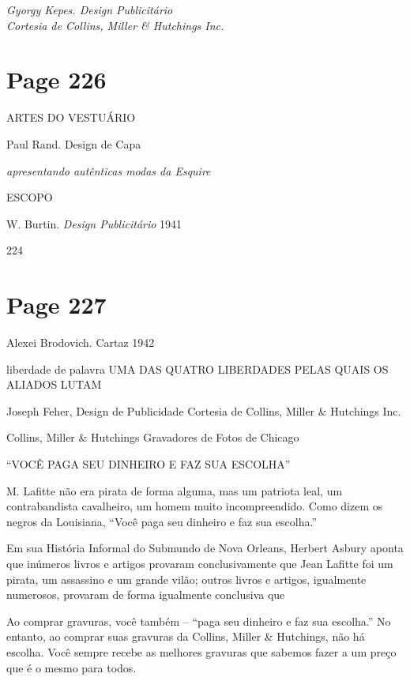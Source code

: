 \documentclass[a4paper]{article}
\begin{document}
\vspace{4em}

\textit{Gyorgy Kepes. Design Publicitário} \\
\textit{Cortesia de Collins, Miller \& Hutchings Inc.}

\vfill
{}

\newpage
\section*{Page 226}

\raggedright

ARTES DO VESTUÁRIO

Paul Rand. Design de Capa

\textit{apresentando autênticas modas da Esquire}

ESCOPO

W. Burtin. \textit{Design Publicitário} 1941

224

\newpage
\section*{Page 227}

Alexei Brodovich. Cartaz 1942

liberdade
de palavra
UMA DAS QUATRO LIBERDADES PELAS QUAIS OS ALIADOS LUTAM

Joseph Feher, Design de Publicidade
Cortesia de Collins, Miller \& Hutchings Inc.

Collins, Miller \& Hutchings Gravadores de Fotos de Chicago

``VOC\^E PAGA SEU DINHEIRO E FAZ SUA ESCOLHA''

M. Lafitte n\~ao era pirata de forma alguma, mas um patriota leal, um contrabandista cavalheiro, um homem muito incompreendido. Como dizem os negros da Louisiana, ``Voc\^e paga seu dinheiro e faz sua escolha.''

Em sua Hist\'oria Informal do Submundo de Nova Orleans, Herbert Asbury aponta que in\'umeros livros e artigos provaram conclusivamente que Jean Lafitte foi um pirata, um assassino e um grande vil\~ao; outros livros e artigos, igualmente numerosos, provaram de forma igualmente conclusiva que

Ao comprar gravuras, voc\^e tamb\'em -- ``paga seu dinheiro e faz sua escolha.'' No entanto, ao comprar suas gravuras da Collins, Miller \& Hutchings, n\~ao h\'a escolha. Voc\^e sempre recebe as melhores gravuras que sabemos fazer a um pre\c co que \'e o mesmo para todos.
\end{document}
